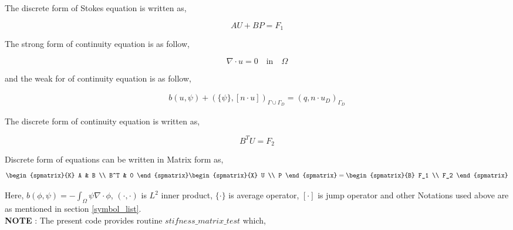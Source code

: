 \documentclass[a4paper,12pt]{book}
\begin{document}
The discrete form of Stokes equation is written as,

\begin{equation} \label{stokes discrete}
AU + BP = F_1
\end{equation}

The strong form of continuity equation is as follow,

\begin{equation}
\nabla \cdot u = 0 \quad \textrm{in} \quad \Omega
\end{equation}

and the weak for of continuity equation is as follow,

\begin{equation}\label{contiuity_weak}
\begin{split}
b(u,\psi) + (\{\psi\},[n\cdot u])_{\Gamma \cup \Gamma_D} = (q,n\cdot u_D)_{\Gamma_D} 
\end{split}
\end{equation}

The discrete form of continuity equation is written as,

\begin{equation} \label{continuity discrete}
B^T U  = F_2
\end{equation}

Discrete form of equations can be written in Matrix form as, \\

\begin{equation} \label{Stokes_matrix}
\begin{spmatrix}{K}
    A & B \\
    B^T & 0
\end{spmatrix}
\begin{spmatrix}{X}
    U \\
    P
\end{spmatrix}
=
\begin{spmatrix}{B}
    F_1  \\
    F_2
\end{spmatrix}
\end{equation}

Here, $b(\phi,\psi) = -\int_{\Omega} \psi \nabla \cdot \phi$, $(\cdot , \cdot)$ is $L^2$ inner product, $\{\cdot\}$ is average operator, $[\cdot]$ is jump operator and other Notations used above are as mentioned in section \ref{symbol_list}.\\

\textbf{NOTE} : The present code provides routine $stifness\_matrix\_test$ which, \\
\end{document}
